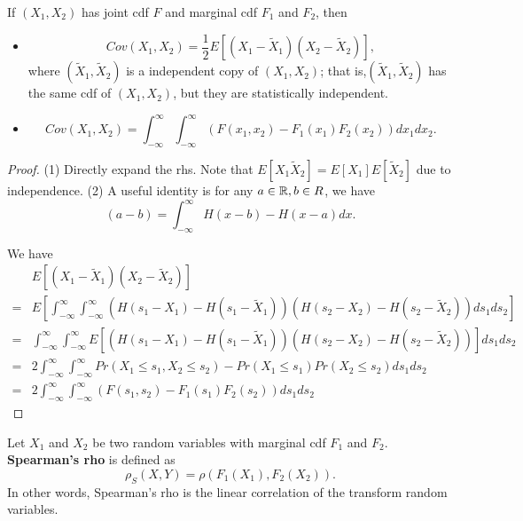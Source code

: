 \begin{refsection}
\begin{lemma}\cite[204]{mcneil2015quantitative}\label{ch:statistical-models:th:HoffdingFormuaForCovariance}
If $(X_1,X_2)$ has joint cdf $F$ and marginal cdf $F_1$ and $F_2$, then
\begin{itemize}
	\item $$Cov(X_1,X_2) = \frac{1}{2}E[(X_1-\tilde{X}_1)(X_2 - \tilde{X}_2)],$$
	where $(\tilde{X}_1,\tilde{X}_2)$ is a independent copy of $(X_1,X_2)$; that is,$(\tilde{X}_1,\tilde{X}_2)$ has the same cdf of $(X_1,X_2)$, but they are statistically independent. 
	\item $$Cov(X_1,X_2) = \int_{-\infty}^{\infty}\int_{-\infty}^{\infty} (F(x_1,x_2) - F_1(x_1)F_2(x_2))dx_1dx_2.$$
\end{itemize}
\end{lemma}
\begin{proof}
(1) Directly expand the rhs. Note that $E[X_1\tilde{X}_2] = E[X_1]E[\tilde{X}_2]$ due to independence.
(2)
A useful identity is for any $a\in \mathbb{R},b\in R$, we have
$$(a-b) = \int_{-\infty}^{\infty} H(x-b) - H(x-a) dx.$$

We have
\begin{align*}
&E[(X_1-\tilde{X}_1)(X_2 - \tilde{X}_2)] \\
=& E[\int_{-\infty}^{\infty} \int_{-\infty}^{\infty} (H(s_1-X_1) - H(s_1-\tilde{X}_1))(  H(s_2-X_2) - H(s_2-\tilde{X}_2)) ds_1ds_2]\\
=&\int_{-\infty}^{\infty} \int_{-\infty}^{\infty} E[(H(s_1-X_1) - H(s_1-\tilde{X}_1))(  H(s_2-X_2) - H(s_2-\tilde{X}_2))] ds_1ds_2 \\
=&2\int_{-\infty}^{\infty} \int_{-\infty}^{\infty} Pr(X_1\leq s_1,X_2\leq s_2) - Pr(X_1\leq s_1)Pr(X_2\leq s_2)ds_1ds_2\\
=&2\int_{-\infty}^{\infty}\int_{-\infty}^{\infty} (F(s_1,s_2) - F_1(s_1)F_2(s_2))ds_1ds_2
\end{align*}
\end{proof}




\begin{definition}\cite[207]{mcneil2015quantitative}
Let $X_1$ and $X_2$ be two random variables with marginal cdf $F_1$ and $F_2$. \textbf{Spearman's rho} is defined as
	$$\rho_{S}(X,Y)  = \rho(F_1(X_1),F_2(X_2)).$$
In other words, Spearman's rho is the linear correlation of the transform random variables.	
\end{definition}



\end{refsection}
